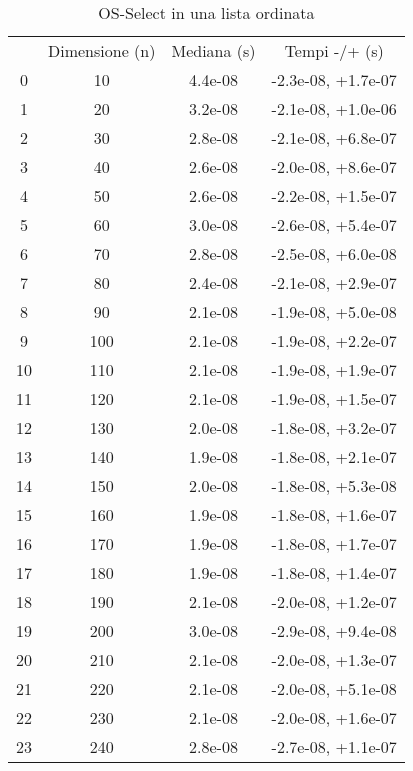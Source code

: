 \begin{table}
\centering
\caption{OS-Select in una lista ordinata}
\label{OS-Select in una lista ordinata}
\begin{adjustbox}{width=1\textwidth/2}
\begin{tabular}{|c|c|c|c|}
\hline
 & Dimensione (n) & Mediana (s) & Tempi -/+ (s) \\
0 & 10 & 4.4e-08 & -2.3e-08, +1.7e-07 \\
\cline{1-4}
1 & 20 & 3.2e-08 & -2.1e-08, +1.0e-06 \\
\cline{1-4}
2 & 30 & 2.8e-08 & -2.1e-08, +6.8e-07 \\
\cline{1-4}
3 & 40 & 2.6e-08 & -2.0e-08, +8.6e-07 \\
\cline{1-4}
4 & 50 & 2.6e-08 & -2.2e-08, +1.5e-07 \\
\cline{1-4}
5 & 60 & 3.0e-08 & -2.6e-08, +5.4e-07 \\
\cline{1-4}
6 & 70 & 2.8e-08 & -2.5e-08, +6.0e-08 \\
\cline{1-4}
7 & 80 & 2.4e-08 & -2.1e-08, +2.9e-07 \\
\cline{1-4}
8 & 90 & 2.1e-08 & -1.9e-08, +5.0e-08 \\
\cline{1-4}
9 & 100 & 2.1e-08 & -1.9e-08, +2.2e-07 \\
\cline{1-4}
10 & 110 & 2.1e-08 & -1.9e-08, +1.9e-07 \\
\cline{1-4}
11 & 120 & 2.1e-08 & -1.9e-08, +1.5e-07 \\
\cline{1-4}
12 & 130 & 2.0e-08 & -1.8e-08, +3.2e-07 \\
\cline{1-4}
13 & 140 & 1.9e-08 & -1.8e-08, +2.1e-07 \\
\cline{1-4}
14 & 150 & 2.0e-08 & -1.8e-08, +5.3e-08 \\
\cline{1-4}
15 & 160 & 1.9e-08 & -1.8e-08, +1.6e-07 \\
\cline{1-4}
16 & 170 & 1.9e-08 & -1.8e-08, +1.7e-07 \\
\cline{1-4}
17 & 180 & 1.9e-08 & -1.8e-08, +1.4e-07 \\
\cline{1-4}
18 & 190 & 2.1e-08 & -2.0e-08, +1.2e-07 \\
\cline{1-4}
19 & 200 & 3.0e-08 & -2.9e-08, +9.4e-08 \\
\cline{1-4}
20 & 210 & 2.1e-08 & -2.0e-08, +1.3e-07 \\
\cline{1-4}
21 & 220 & 2.1e-08 & -2.0e-08, +5.1e-08 \\
\cline{1-4}
22 & 230 & 2.1e-08 & -2.0e-08, +1.6e-07 \\
\cline{1-4}
23 & 240 & 2.8e-08 & -2.7e-08, +1.1e-07 \\

\end{tabular}
\end{adjustbox}
\end{table}
